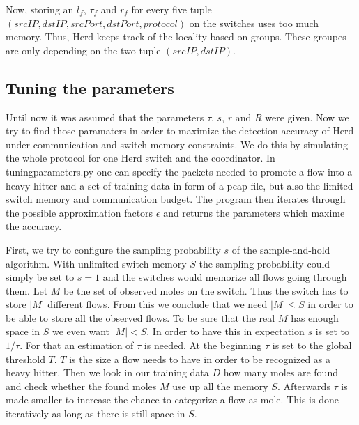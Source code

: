 \documentclass[11pt,oneside,a4paper]{article}
\begin{document}
Now, storing an $l_f$, $\tau_f$ and $r_f$ for every five tuple $(srcIP, dstIP, srcPort, dstPort, protocol)$ on the switches uses too much memory. Thus, Herd keeps track of the locality based on groups. These groupes are only depending on the two tuple $(srcIP, dstIP)$.

\subsection{Tuning the parameters} \label{tuningparameters}
Until now it was assumed that the parameters $\tau$, $s$, $r$ and $R$ were given. Now we try to find those paramaters in order to maximize the detection accuracy of Herd under communication and switch memory constraints. We do this by simulating the whole protocol for one Herd switch and the coordinator. In tuningparameters.py one can specify the packets needed to promote a flow into a heavy hitter and a set of training data in form of a pcap-file, but also the limited switch memory and communication budget. The program then iterates through the possible approximation factors $\epsilon$ and returns the parameters which maxime the accuracy.

First, we try to configure the sampling probability $s$ of the sample-and-hold algorithm. With unlimited switch memory $S$ the sampling probability could simply be set to $s=1$ and the switches would memorize all flows going through them. Let $M$ be the set of observed moles on the switch. Thus the switch has to store $|M|$ different flows. From this we conclude that we need $|M| \leq S$ in order to be able to store all the observed flows. To be sure that the real $M$ has enough space in $S$ we even want $|M| < S$. In order to have this in expectation $s$ is set to $1/\tau$. For that an estimation of $\tau$ is needed. At the beginning $\tau$ is set to the global threshold $T$. $T$ is the size a flow needs to have in order to be recognized as a heavy hitter. Then we look in our training data $D$ how many moles are found and check whether the found moles $M$ use up all the memory $S$. Afterwards $\tau$ is made smaller to increase the chance to categorize a flow as mole. This is done iteratively as long as there is still space in $S$. 
\end{document}

